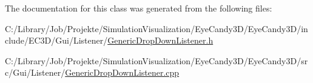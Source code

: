 The documentation for this class was generated from the following files\+:\begin{DoxyCompactItemize}
\item 
C\+:/\+Library/\+Job/\+Projekte/\+Simulation\+Visualization/\+Eye\+Candy3\+D/\+Eye\+Candy3\+D/include/\+E\+C3\+D/\+Gui/\+Listener/\mbox{\hyperlink{_generic_drop_down_listener_8h}{Generic\+Drop\+Down\+Listener.\+h}}\item 
C\+:/\+Library/\+Job/\+Projekte/\+Simulation\+Visualization/\+Eye\+Candy3\+D/\+Eye\+Candy3\+D/src/\+Gui/\+Listener/\mbox{\hyperlink{_generic_drop_down_listener_8cpp}{Generic\+Drop\+Down\+Listener.\+cpp}}\end{DoxyCompactItemize}
